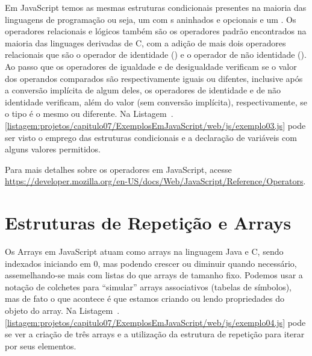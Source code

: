 Em JavaScript temos as mesmas estruturas condicionais presentes na maioria das linguagens de programação ou seja, um  com s aninhados e opcionais e um . Os operadores relacionais e lógicos também são os operadores padrão encontrados na maioria das linguages derivadas de C, com a adição de mais dois operadores relacionais que são o operador de identidade (\inlineJavaScriptCode{===}) e o operador de não identidade (\inlineJavaScriptCode{!==}). Ao passo que os operadores de igualdade e de desigualdade verificam se o valor dos operandos comparados são respectivamente iguais ou difentes, inclusive após a conversão implícita de algum deles, os operadores de identidade e de não identidade verificam, além do valor (sem conversão implícita), respectivamente, se o tipo é o mesmo ou diferente. Na Listagem~\thechapter.\ref{listagem:projetos/capitulo07/ExemplosEmJavaScript/web/js/exemplo03.js} pode ser visto o emprego das estruturas condicionais e a declaração de variáveis com alguns valores permitidos.


\begin{saibaMais}
    Para mais detalhes sobre os operadores em JavaScript, acesse \url{https://developer.mozilla.org/en-US/docs/Web/JavaScript/Reference/Operators}.
\end{saibaMais}


\section{Estruturas de Repetição e Arrays}

Os Arrays em JavaScript atuam como arrays na linguagem Java e C, sendo indexados iniciando em 0, mas podendo crescer ou diminuir quando necessário, assemelhando-se mais com listas do que arrays de tamanho fixo. Podemos usar a notação de colchetes para ``simular'' arrays associativos (tabelas de símbolos), mas de fato o que acontece é que estamos criando ou lendo propriedades do objeto do array. Na Listagem~\thechapter.\ref{listagem:projetos/capitulo07/ExemplosEmJavaScript/web/js/exemplo04.js} pode se ver a criação de três arrays e a utilização da estrutura de repetição  para iterar por seus elementos.


